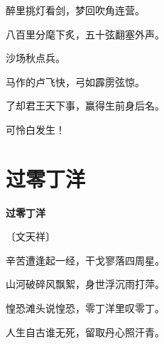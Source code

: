 \documentclass[12pt,UTF-8,openany,fontset=none]{ctexbook}
\begin{document}
\begin{center}
    \begin{Large}

        醉里挑灯看剑，梦回吹角连营。

        八百里分麾下炙，五十弦翻塞外声。

        沙场秋点兵。

        \vspace{18pt}  %

        马作的卢飞快，弓如霹雳弦惊。

        了却君王天下事，赢得生前身后名。

        可怜白发生！

    \end{Large}

\end{center}

\vspace{8pt}
\clearpage

\section{过零丁洋}


\begin{center}
    {\bfseries 过零丁洋}

    \vspace{18pt}

    \begin{large}\xuwen
        〔文天祥〕
    \end{large}

\end{center}

    \vspace{18pt}  %

\begin{center}
    \begin{Large}

        辛苦遭逢起一经，干戈寥落四周星。

        山河破碎风飘絮，身世浮沉雨打萍。

        惶恐滩头说惶恐，零丁洋里叹零丁。

        人生自古谁无死，留取丹心照汗青。

    \end{Large}

\end{center}

\vspace{8pt}
\clearpage
\end{document}
